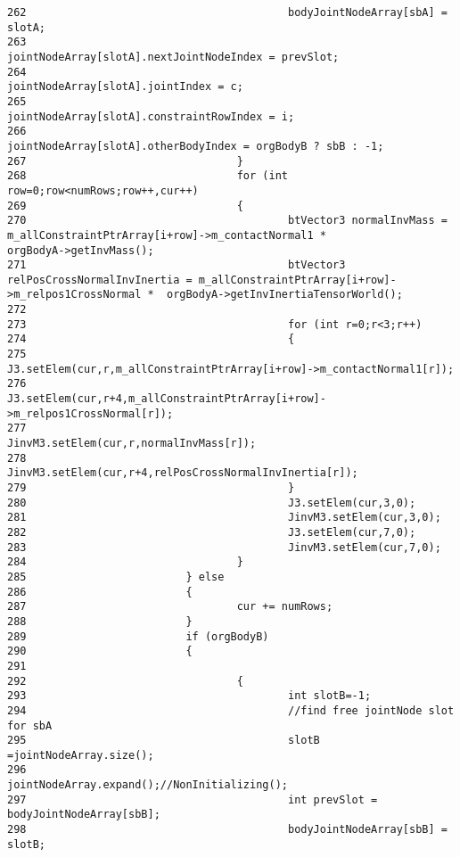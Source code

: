 \begin{Code}
\begin{verbatim}
262                                         bodyJointNodeArray[sbA] = slotA;
263                                         jointNodeArray[slotA].nextJointNodeIndex = prevSlot;
264                                         jointNodeArray[slotA].jointIndex = c;
265                                         jointNodeArray[slotA].constraintRowIndex = i;
266                                         jointNodeArray[slotA].otherBodyIndex = orgBodyB ? sbB : -1;
267                                 }
268                                 for (int row=0;row<numRows;row++,cur++)
269                                 {
270                                         btVector3 normalInvMass =                               m_allConstraintPtrArray[i+row]->m_contactNormal1 *              orgBodyA->getInvMass();
271                                         btVector3 relPosCrossNormalInvInertia = m_allConstraintPtrArray[i+row]->m_relpos1CrossNormal *  orgBodyA->getInvInertiaTensorWorld();
272 
273                                         for (int r=0;r<3;r++)
274                                         {
275                                                 J3.setElem(cur,r,m_allConstraintPtrArray[i+row]->m_contactNormal1[r]);
276                                                 J3.setElem(cur,r+4,m_allConstraintPtrArray[i+row]->m_relpos1CrossNormal[r]);
277                                                 JinvM3.setElem(cur,r,normalInvMass[r]);
278                                                 JinvM3.setElem(cur,r+4,relPosCrossNormalInvInertia[r]);
279                                         }
280                                         J3.setElem(cur,3,0);
281                                         JinvM3.setElem(cur,3,0);
282                                         J3.setElem(cur,7,0);
283                                         JinvM3.setElem(cur,7,0);
284                                 }
285                         } else
286                         {
287                                 cur += numRows;
288                         }
289                         if (orgBodyB)
290                         {
291 
292                                 {
293                                         int slotB=-1;
294                                         //find free jointNode slot for sbA
295                                         slotB =jointNodeArray.size();
296                                         jointNodeArray.expand();//NonInitializing();
297                                         int prevSlot = bodyJointNodeArray[sbB];
298                                         bodyJointNodeArray[sbB] = slotB;

\end{verbatim}
\end{Code}
